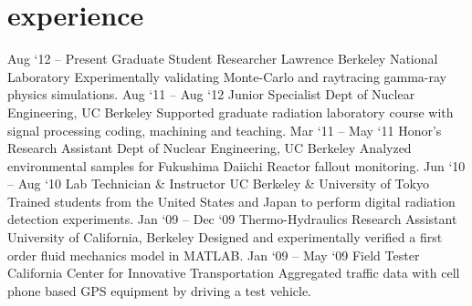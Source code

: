 \documentclass[print]{resume} %
\begin{document}
\section{experience}
\begin{entrylist}
\entry
{Aug `12 -- Present}
{Graduate Student Researcher}
{Lawrence Berkeley National Laboratory}
{
Experimentally validating Monte-Carlo and raytracing gamma-ray physics simulations.
}
\entry
{Aug `11 -- Aug `12}
{Junior Specialist}
{Dept of Nuclear Engineering, UC Berkeley}
{
Supported graduate radiation laboratory course with signal processing coding, machining and teaching.%
}
\entry
{Mar `11 -- May `11}
{Honor's Research Assistant}
{Dept of Nuclear Engineering, UC Berkeley}
{
Analyzed environmental samples for Fukushima Daiichi Reactor fallout monitoring.%
}
\entry
{Jun `10 -- Aug `10}
{Lab Technician \& Instructor}
{UC Berkeley \& University of Tokyo}
{
Trained students from the United States and Japan to perform digital radiation detection experiments.%
}
\entry
{Jan `09 -- Dec `09}
{Thermo-Hydraulics Research Assistant}
{University of California, Berkeley}
{
Designed and experimentally verified a first order fluid mechanics model in MATLAB.
}
\entry
{Jan `09 -- May `09}
{Field Tester}
{California Center for Innovative Transportation}
{
Aggregated traffic data with cell phone based GPS equipment by driving a test vehicle.%
}
\end{entrylist}
\end{document}
